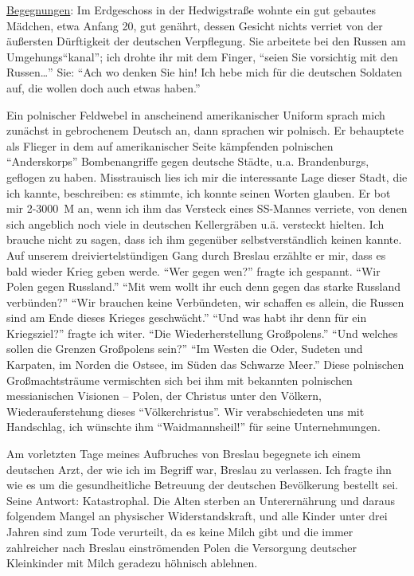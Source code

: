 \underline{Begegnungen}: Im Erdgeschoss in der Hedwigstraße wohnte ein gut gebautes Mädchen, etwa Anfang 20, gut genährt, dessen Gesicht nichts verriet von der äußersten Dürftigkeit der deutschen Verpflegung. Sie arbeitete bei den Russen am Umgehungs\enquote{kanal}; ich drohte ihr mit dem Finger, \enquote{seien Sie vorsichtig mit den Russen\dots} Sie: \enquote{Ach wo denken Sie hin! Ich hebe mich für die deutschen Soldaten auf, die wollen doch auch etwas haben.}

Ein polnischer Feldwebel in anscheinend amerikanischer Uniform sprach mich zunächst in gebrochenem Deutsch an, dann sprachen wir polnisch. Er behauptete als Flieger in dem auf amerikanischer Seite kämpfenden polnischen \enquote{Anderskorps} Bombenangriffe gegen deutsche Städte, u.a. Brandenburgs, geflogen zu haben. Misstrauisch lies ich mir die interessante Lage  dieser Stadt, die ich kannte, beschreiben: es stimmte, ich konnte seinen Worten glauben. Er bot mir 2-3000~M an, wenn ich ihm das Versteck eines SS-Mannes verriete, von denen sich angeblich noch viele in deutschen Kellergräben u.ä. versteckt hielten. Ich brauche nicht zu sagen, dass ich ihm gegenüber selbstverständlich keinen kannte. Auf unserem dreiviertelstündigen Gang durch Breslau erzählte er mir, dass es bald wieder Krieg geben werde. \enquote{Wer gegen wen?} fragte ich gespannt. \enquote{Wir Polen gegen Russland.} \enquote{Mit wem wollt ihr euch denn gegen das starke Russland verbünden?} \enquote{Wir brauchen keine Verbündeten, wir schaffen es allein, die Russen sind am Ende dieses Krieges geschwächt.} \enquote{Und was habt ihr denn für ein Kriegsziel?} fragte ich witer. \enquote{Die Wiederherstellung Großpolens.} \enquote{Und welches sollen die Grenzen Großpolens sein?} \enquote{Im Westen die Oder, Sudeten und Karpaten, im Norden die Ostsee, im Süden das Schwarze Meer.} Diese polnischen Großmachtsträume vermischten sich bei ihm mit bekannten polnischen messianischen Visionen -- Polen, der Christus unter den Völkern, Wiederauferstehung dieses \enquote{Völkerchristus}. Wir verabschiedeten  uns mit Handschlag, ich wünschte ihm \enquote{Waidmannsheil!} für seine Unternehmungen.

Am vorletzten Tage meines Aufbruches von Breslau begegnete ich einem deutschen Arzt, der wie ich im Begriff war, Breslau zu verlassen. Ich fragte ihn wie es um die gesundheitliche Betreuung der deutschen Bevölkerung bestellt sei. Seine Antwort: Katastrophal. Die Alten sterben an Unterernährung und daraus folgendem Mangel an physischer Widerstandskraft, und alle Kinder unter drei Jahren sind zum Tode verurteilt, da es keine Milch gibt und die immer zahlreicher nach Breslau einströmenden Polen die Versorgung deutscher Kleinkinder mit Milch geradezu höhnisch ablehnen.

